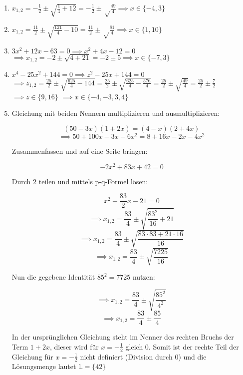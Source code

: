 \item

\begin{enumerate}

\item $x_{1,2} = -\frac{1}{2} \pm \sqrt{\frac{1}{4}+12} = -\frac{1}{2} \pm \sqrt\frac{49}{4} \implies x \in \{-4, 3\}$

\item $x_{1,2} = \frac{11}{2} \pm \sqrt{\frac{121}{4}-10} = \frac{11}{2} \pm \sqrt\frac{81}{4} \implies x \in \{1, 10\}$

\item $3x^2+12x-63 = 0 \implies x^2+4x-12 = 0$\\
$\implies x_{1,2} = -2 \pm \sqrt{4+21} = -2 \pm 5 \implies x \in \{-7, 3\}$

\item $x^4-25x^2+144 = 0 \implies z^2-25x+144=0$ \\
$\implies z_{1,2} = \frac{25}{2} \pm \sqrt{\frac{625}{4} - 144} = \frac{25}{2} \pm \sqrt{\frac{625}{4} - \frac{576}{4}} = \frac{25}{2} \pm \sqrt{\frac{49}{4}} = \frac{25}{2} \pm \frac{7}{2}$  \\
$\implies z \in \{9, 16\}$
$\implies x \in \{-4, -3, 3, 4\}$

\item Gleichung mit beiden Nennern multiplizieren und ausmultiplizieren:

$$(50-3x)(1+2x) = (4-x)(2+4x)$$
$$\implies 50 + 100x -3x -6x^2  = 8+16x-2x-4x^2$$

Zusammenfassen und auf eine Seite bringen:

$$-2x^2+83x+42 = 0$$

Durch $2$ teilen und mittels p-q-Formel lösen:

$$x^2-\frac{83}{2}x -21 = 0$$
$$\implies x_{1,2} = \frac{83}{4} \pm \sqrt{\frac{83^2}{16} + 21}$$
$$\implies x_{1,2} = \frac{83}{4} \pm \sqrt{\frac{83\cdot 83+21\cdot 16}{16}}$$
$$\implies x_{1,2} = \frac{83}{4} \pm \sqrt{\frac{7225}{16}}$$

Nun die gegebene Identität $85^2=7725$ nutzen:

$$\implies x_{1,2} = \frac{83}{4} \pm \sqrt{\frac{85^2}{4^2}}$$
$$\implies x_{1,2} = \frac{83}{4} \pm \frac{85}{4}$$

In der ursprünglichen Gleichung steht im Nenner des rechten Bruchs der Term $1+2x$, dieser wird für $x=-\frac{1}{2}$ gleich $0$. Somit ist der rechte Teil der Gleichung für $x=-\frac{1}{2}$ nicht definiert (Division durch $0$) und die Lösungsmenge lautet $\mathbb{L} = \{42\}$ 

\end{enumerate}

